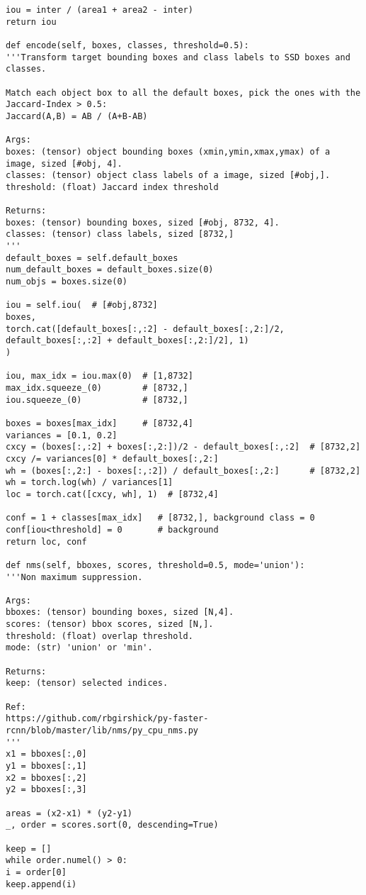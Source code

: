 \begin{lstlisting}
iou = inter / (area1 + area2 - inter)
return iou

def encode(self, boxes, classes, threshold=0.5):
'''Transform target bounding boxes and class labels to SSD boxes and classes.

Match each object box to all the default boxes, pick the ones with the
Jaccard-Index > 0.5:
Jaccard(A,B) = AB / (A+B-AB)

Args:
boxes: (tensor) object bounding boxes (xmin,ymin,xmax,ymax) of a image, sized [#obj, 4].
classes: (tensor) object class labels of a image, sized [#obj,].
threshold: (float) Jaccard index threshold

Returns:
boxes: (tensor) bounding boxes, sized [#obj, 8732, 4].
classes: (tensor) class labels, sized [8732,]
'''
default_boxes = self.default_boxes
num_default_boxes = default_boxes.size(0)
num_objs = boxes.size(0)

iou = self.iou(  # [#obj,8732]
boxes,
torch.cat([default_boxes[:,:2] - default_boxes[:,2:]/2,
default_boxes[:,:2] + default_boxes[:,2:]/2], 1)
)

iou, max_idx = iou.max(0)  # [1,8732]
max_idx.squeeze_(0)        # [8732,]
iou.squeeze_(0)            # [8732,]

boxes = boxes[max_idx]     # [8732,4]
variances = [0.1, 0.2]
cxcy = (boxes[:,:2] + boxes[:,2:])/2 - default_boxes[:,:2]  # [8732,2]
cxcy /= variances[0] * default_boxes[:,2:]
wh = (boxes[:,2:] - boxes[:,:2]) / default_boxes[:,2:]      # [8732,2]
wh = torch.log(wh) / variances[1]
loc = torch.cat([cxcy, wh], 1)  # [8732,4]

conf = 1 + classes[max_idx]   # [8732,], background class = 0
conf[iou<threshold] = 0       # background
return loc, conf

def nms(self, bboxes, scores, threshold=0.5, mode='union'):
'''Non maximum suppression.

Args:
bboxes: (tensor) bounding boxes, sized [N,4].
scores: (tensor) bbox scores, sized [N,].
threshold: (float) overlap threshold.
mode: (str) 'union' or 'min'.

Returns:
keep: (tensor) selected indices.

Ref:
https://github.com/rbgirshick/py-faster-rcnn/blob/master/lib/nms/py_cpu_nms.py
'''
x1 = bboxes[:,0]
y1 = bboxes[:,1]
x2 = bboxes[:,2]
y2 = bboxes[:,3]

areas = (x2-x1) * (y2-y1)
_, order = scores.sort(0, descending=True)

keep = []
while order.numel() > 0:
i = order[0]
keep.append(i)


\end{lstlisting}
